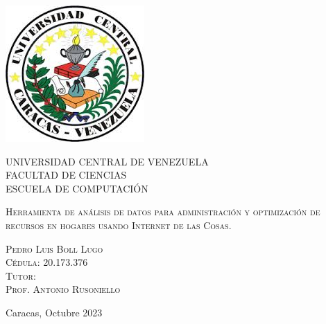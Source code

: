 \thispagestyle{empty}

\begin{minipage}[c][0.01\textheight][t]{0.85\textwidth}
\begin{center}

\includegraphics[scale=0.8]{./Figuras/ucv_logo.jpg}

\bigskip\bigskip\bigskip

{\centering \scshape \large
UNIVERSIDAD CENTRAL DE VENEZUELA \\
FACULTAD DE CIENCIAS \\
ESCUELA DE COMPUTACIÓN \\[38pt]}


\bigskip
{\scshape \LARGE 
Herramienta de análisis de datos para administración y optimización de recursos en hogares usando Internet de las Cosas. 
\\[60pt]} 

\vspace{5mm}

{ \scshape \renewcommand\baselinestretch{1}\selectfont    
Pedro Luis Boll Lugo\\
Cédula: 20.173.376 \\[30pt]

Tutor:\\
Prof. Antonio Rusoniello\\[30pt]

\vspace{10mm}

Caracas, Octubre 2023\\[60pt]
\vfill
}


\end{center}
\end{minipage}